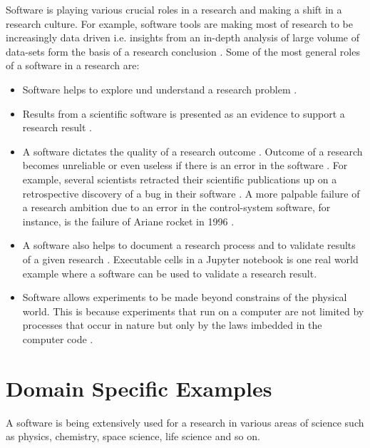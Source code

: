Software is playing various crucial roles in a research and making a shift in a research culture. For example, software tools are making most of research to be increasingly data driven i.e. insights from an in-depth analysis of large volume of data-sets form the basis of a research conclusion \citep{goble2014better, jay2020software}. Some of the most general roles of a software in a research are:

\begin{itemize}%

	\item Software helps to explore und understand a research problem \citep{hannay2009scientists}.
	\item Results from a scientific software is presented as an evidence to support a research result \citep{kanewala2014testing}. 
	\item A software dictates the quality of a research outcome \citep{hannay2009scientists}. Outcome of a research becomes unreliable or even useless if there is an error in the software \citep{soergel2014rampant}. For example, several scientists retracted their scientific publications up on a retrospective discovery of a bug in their software \citep{wilson2014best, merali2010computational, miller2006scientist}. A more palpable failure of a research ambition due to an error in the control-system software, for instance, is the failure of Ariane rocket in 1996 \citep{enwiki:1054482061}.  
	\item A software also helps to document a research process and to validate results of a given research \citep{jay2020software}. Executable cells in a Jupyter notebook is one real world example where a software can be used to validate a research result.
	\item Software allows experiments to be made beyond constrains of the physical world. This is because experiments that run on a computer are not limited by processes that occur in nature but only by the laws imbedded in the computer code \citep{wolfram1984computer}. 

\end{itemize}

\section{Domain Specific Examples}
\label{subsec:background:first_section:second_subsection}
A software is being extensively used for a research in various areas of science such as physics, chemistry, space science, life science and so on.

